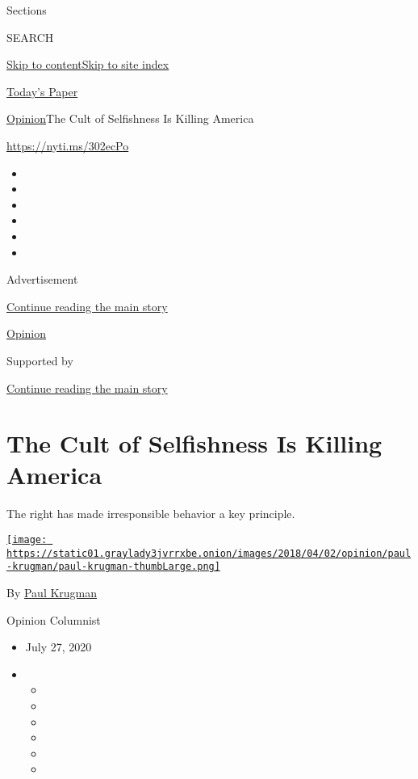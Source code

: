Sections

SEARCH

\protect\hyperlink{site-content}{Skip to
content}\protect\hyperlink{site-index}{Skip to site index}

\href{https://myaccount.nytimes3xbfgragh.onion/auth/login?response_type=cookie\&client_id=vi}{}

\href{https://www.nytimes3xbfgragh.onion/section/todayspaper}{Today's
Paper}

\href{/section/opinion}{Opinion}\textbar{}The Cult of Selfishness Is
Killing America

\url{https://nyti.ms/302ecPo}

\begin{itemize}
\item
\item
\item
\item
\item
\item
\end{itemize}

Advertisement

\protect\hyperlink{after-top}{Continue reading the main story}

\href{/section/opinion}{Opinion}

Supported by

\protect\hyperlink{after-sponsor}{Continue reading the main story}

\hypertarget{the-cult-of-selfishness-is-killing-america}{%
\section{The Cult of Selfishness Is Killing
America}\label{the-cult-of-selfishness-is-killing-america}}

The right has made irresponsible behavior a key principle.

\href{https://www.nytimes3xbfgragh.onion/by/paul-krugman}{\texttt{[image: https://static01.graylady3jvrrxbe.onion/images/2018/04/02/opinion/paul-krugman/paul-krugman-thumbLarge.png]}}

By \href{https://www.nytimes3xbfgragh.onion/by/paul-krugman}{Paul
Krugman}

Opinion Columnist

\begin{itemize}
\item
  July 27, 2020
\item
  \begin{itemize}
  \item
  \item
  \item
  \item
  \item
  \item
  \end{itemize}
\end{itemize}

